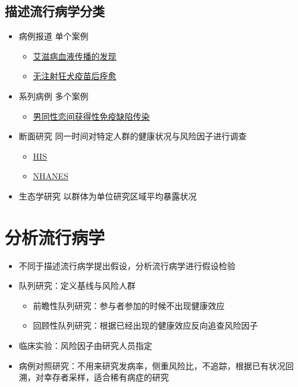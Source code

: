 \documentclass[
]{book}
\providecommand{\tightlist}{%
  \setlength{\itemsep}{0pt}\setlength{\parskip}{0pt}}
\begin{document}
\hypertarget{ux63cfux8ff0ux6d41ux884cux75c5ux5b66ux5206ux7c7b}{%
\subsection{描述流行病学分类}\label{ux63cfux8ff0ux6d41ux884cux75c5ux5b66ux5206ux7c7b}}

\begin{itemize}
\tightlist
\item
  病例报道 单个案例

  \begin{itemize}
  \tightlist
  \item
    \href{http://www.thelancet.com/journals/lancet/article/PIIS0140-6736(83)92082-2/abstract\#}{艾滋病血液传播的发现}
  \item
    \href{http://www.nejm.org/doi/full/10.1056/NEJMoa050382\#t=abstract}{无注射狂犬疫苗后痊愈}
  \end{itemize}
\item
  系列病例 多个案例

  \begin{itemize}
  \tightlist
  \item
    \href{http://www.nejm.org/doi/pdf/10.1056/NEJM198112103052401}{男同性恋间获得性免疫缺陷传染}
  \end{itemize}
\item
  断面研究 同一时间对特定人群的健康状况与风险因子进行调查

  \begin{itemize}
  \tightlist
  \item
    \href{http://www.cdc.gov/nchs/nhis.htm}{HIS}
  \item
    \href{http://www.cdc.gov/nchs/nhanes.htm}{NHANES}
  \end{itemize}
\item
  生态学研究 以群体为单位研究区域平均暴露状况
\end{itemize}

\hypertarget{ux5206ux6790ux6d41ux884cux75c5ux5b66}{%
\section{分析流行病学}\label{ux5206ux6790ux6d41ux884cux75c5ux5b66}}

\begin{itemize}
\tightlist
\item
  不同于描述流行病学提出假设，分析流行病学进行假设检验
\item
  队列研究：定义基线与风险人群

  \begin{itemize}
  \tightlist
  \item
    前瞻性队列研究：参与者参加的时候不出现健康效应
  \item
    回顾性队列研究：根据已经出现的健康效应反向追查风险因子
  \end{itemize}
\item
  临床实验：风险因子由研究人员指定
\item
  病例对照研究：不用来研究发病率，侧重风险比，不追踪，根据已有状况回溯，对幸存者采样，适合稀有病症的研究
\end{itemize}
\end{document}
